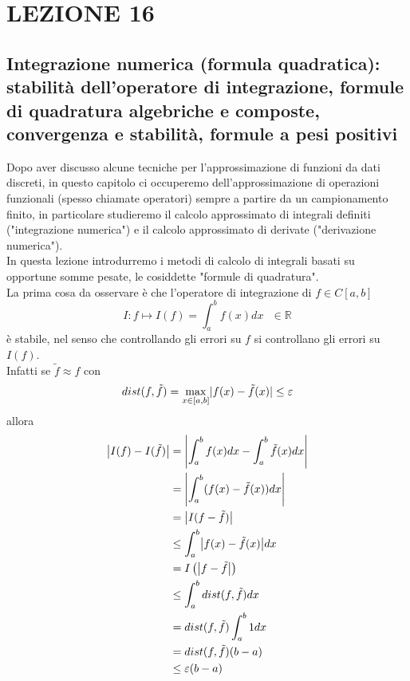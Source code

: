 \documentclass[12pt,a4paper]{article}
\DeclarePairedDelimiter{\abs}{\lvert}{\rvert}
\begin{document}
\section*{LEZIONE 16}
\subsection*{Integrazione numerica (formula quadratica): stabilità dell'operatore di integrazione, formule di quadratura algebriche e composte, convergenza e stabilità, formule a pesi positivi}

Dopo aver discusso alcune tecniche per l'approssimazione di funzioni da dati discreti, in questo capitolo ci occuperemo dell'approssimazione di operazioni funzionali (spesso chiamate operatori) sempre a partire da un campionamento finito, in particolare studieremo il calcolo approssimato di integrali definiti ("integrazione numerica") e il calcolo approssimato di derivate ("derivazione numerica").\\
In questa lezione introdurremo i metodi di calcolo di integrali basati su opportune somme pesate, le cosiddette "formule di quadratura".\\
La prima cosa da osservare è che l'operatore di integrazione di $f\in C[a,b]$
\begin{equation*}
    I:f\longmapsto I(f)=\int_a^bf(x) dx\  \  \  \in\mathbb{R}
\end{equation*}
è stabile, nel senso che controllando gli errori su $f$ si controllano gli errori su $I(f)$.\\ Infatti se $\tilde{f}\approx f$ con 
\begin{equation*}
dist(f,\tilde{f})= \max_{x\in[a,b]}\abs{f(x)-\tilde{f}(x)}\leq\varepsilon
\end{equation*}
allora
\begin{equation*}
\begin{split}
        \abs*{I(f)-I(\tilde{f})} & = \abs*{\int_a^b f(x)dx-\int_a^b \tilde{f}(x)dx} \\
        & = \abs*{\int_a^b(f(x)-\tilde{f}(x))dx} \\
        & = \abs*{I(f-\tilde{f})} \\
        & \leq \int_a^b \abs*{f(x)-\tilde{f}(x)}dx \\
        & = I\left(\abs*{f-\tilde{f}}\right) \\
        & \leq \int_a^b dist(f,\tilde{f})dx \\
        & = dist(f, \tilde{f})\int_a^b 1 dx \\
        & = dist(f, \tilde{f})(b-a)\\
        & \leq\varepsilon(b-a)
\end{split}
\end{equation*}
\end{document}
